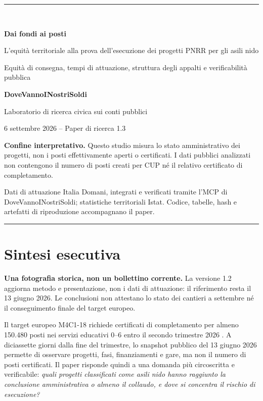 \documentclass[10pt,a4paper]{article}
\newcommand{\researchnote}[1]{%
  \par\addvspace{0.5\baselineskip}
  \noindent #1\par
  \addvspace{0.5\baselineskip}
}
\begin{document}
\begin{titlepage}
  \thispagestyle{empty}
  \vspace*{1.7cm}
  {\color{dvnsblue}\rule{\textwidth}{3pt}}\\[1.1cm]
  {\Huge\bfseries\color{dvnsnavy} Dai fondi ai posti\par}
  \vspace{0.45cm}
  {\LARGE L'equità territoriale alla prova dell'esecuzione dei progetti PNRR per gli asili nido\par}
  \vspace{0.65cm}
  {\large Equità di consegna, tempi di attuazione, struttura degli appalti e verificabilità pubblica\par}
  \vfill
  {\large\bfseries DoveVannoINostriSoldi\par}
  {\normalsize Laboratorio di ricerca civica sui conti pubblici\par}
  \vspace{0.5cm}
  {\normalsize 6 settembre 2026 -- Paper di ricerca 1.3\par}
  \vfill
  \researchnote{\textbf{Confine interpretativo.} Questo studio misura lo stato amministrativo dei progetti, non i posti effettivamente aperti o certificati. I dati pubblici analizzati non contengono il numero di posti creati per CUP né il relativo certificato di completamento.}
  \vspace{0.4cm}
  {\small\color{dvnsgrey}Dati di attuazione Italia Domani, integrati e verificati tramite l'MCP di DoveVannoINostriSoldi; statistiche territoriali Istat. Codice, tabelle, hash e artefatti di riproduzione accompagnano il paper.\par}
  \vspace{0.8cm}
  {\color{dvnsblue}\rule{\textwidth}{1pt}}
\end{titlepage}

\section*{Sintesi esecutiva}

\researchnote{\textbf{Una fotografia storica, non un bollettino corrente.} La versione 1.2 aggiorna metodo e presentazione, non i dati di attuazione: il riferimento resta il 13 giugno 2026. Le conclusioni non attestano lo stato dei cantieri a settembre né il conseguimento finale del target europeo.}

Il target europeo M4C1-18 richiede certificati di completamento per almeno 150.480 posti nei servizi educativi 0--6 entro il secondo trimestre 2026 \citep{ec2026target}. A diciassette giorni dalla fine del trimestre, lo snapshot pubblico del 13 giugno 2026 permette di osservare progetti, fasi, finanziamenti e gare, ma non il numero di posti certificati. Il paper risponde quindi a una domanda più circoscritta e verificabile: \emph{quali progetti classificati come asili nido hanno raggiunto la conclusione amministrativa o almeno il collaudo, e dove si concentra il rischio di esecuzione?}
\end{document}
